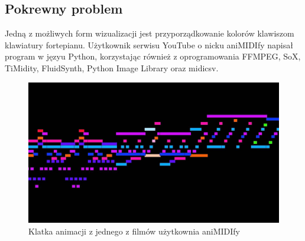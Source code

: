 \documentclass[12pt]{article}
\begin{document}
\subsection{Pokrewny problem}
Jedną z możliwych form wizualizacji jest przyporządkowanie kolorów klawiszom klawiatury fortepianu. Użytkownik serwisu YouTube o nicku aniMIDIfy napisał program w języu Python, korzystając również z oprogramowania FFMPEG, SoX, TiMidity, FluidSynth, Python Image Library oraz midicsv.
\begin{figure}[H]
	\centering
	\includegraphics[width=\textwidth]{animidify.jpg}
	\caption{Klatka animacji z jednego z filmów użytkownia aniMIDIfy}
\end{figure}
\end{document}
